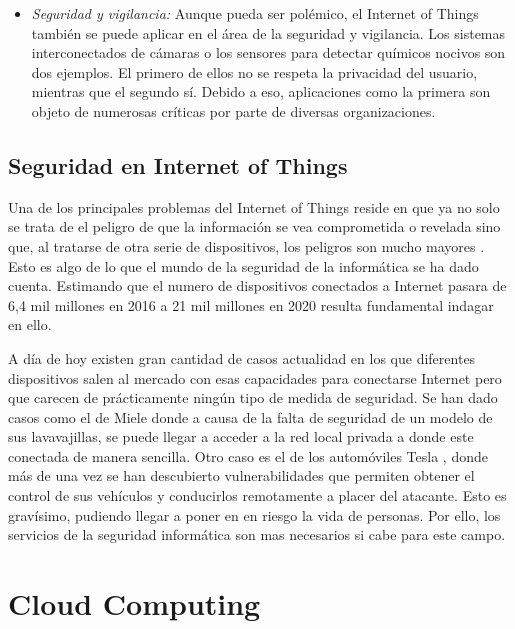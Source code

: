 \begin{itemize}
	\item \emph{Seguridad y vigilancia:} Aunque pueda ser polémico, el Internet of Things también se puede aplicar en el área de la seguridad y vigilancia. Los sistemas interconectados de cámaras o los sensores para detectar químicos nocivos son dos ejemplos. El primero de ellos no se respeta la privacidad del usuario, mientras que el segundo sí. Debido a eso, aplicaciones como la primera son objeto de numerosas críticas por parte de diversas organizaciones.
	
\end{itemize}

\subsection{Seguridad en Internet of Things}

Una de los principales problemas del Internet of Things reside en que ya no solo se trata de el peligro de que la información se vea comprometida o revelada sino que, al tratarse de otra serie de dispositivos, los peligros son mucho mayores \cite{iot-qz}\cite{iot-techradar}. Esto es algo de lo que el mundo de la seguridad de la informática se ha dado cuenta. Estimando que el numero de dispositivos conectados a Internet pasara de 6,4 mil millones en 2016 a 21 mil millones en 2020 \cite{iot-searchdatacenter} resulta fundamental indagar en ello. 

A día de hoy existen gran cantidad de casos actualidad en los que diferentes dispositivos salen al mercado con esas capacidades para conectarse Internet pero que carecen de prácticamente ningún tipo de medida de seguridad. Se han dado casos como el de Miele\cite{iot-miele} donde a causa de la falta de seguridad de un modelo de sus lavavajillas, se puede llegar a acceder a la red local privada a donde este conectada de manera sencilla. Otro caso es el de los automóviles Tesla \cite{iot-tesla}, donde más de una vez se han descubierto vulnerabilidades que permiten obtener el control de sus vehículos y conducirlos remotamente a placer del atacante. Esto es gravísimo, pudiendo llegar a poner en en riesgo la vida de personas. Por ello, los servicios de la seguridad informática son mas necesarios si cabe para este campo. 



\section{Cloud Computing}

